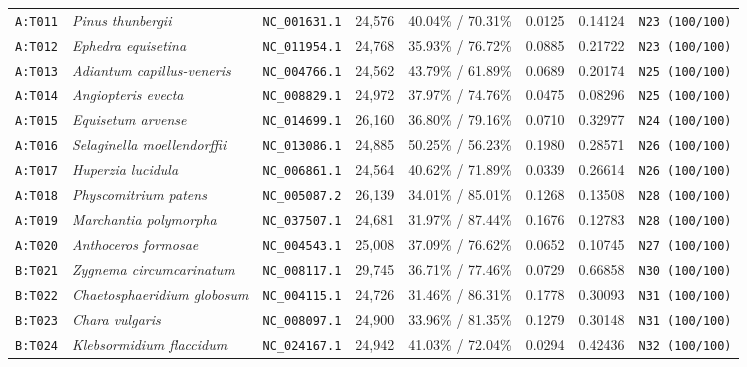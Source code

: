 \documentclass[10pt,letterpaper]{article}
\begin{document}
\begin{longtable}{llllllll}
\texttt{A:T011} & \textit{Pinus thunbergii} & \texttt{NC\_001631.1} & 24,576 & 40.04\% / 70.31\% & 0.0125 & 0.14124 & \texttt{N23 (100/100)} \\
\texttt{A:T012} & \textit{Ephedra equisetina} & \texttt{NC\_011954.1} & 24,768 & 35.93\% / 76.72\% & 0.0885 & 0.21722 & \texttt{N23 (100/100)} \\
\texttt{A:T013} & \textit{Adiantum capillus-veneris} & \texttt{NC\_004766.1} & 24,562 & 43.79\% / 61.89\% & 0.0689 & 0.20174 & \texttt{N25 (100/100)} \\
\texttt{A:T014} & \textit{Angiopteris evecta} & \texttt{NC\_008829.1} & 24,972 & 37.97\% / 74.76\% & 0.0475 & 0.08296 & \texttt{N25 (100/100)} \\
\texttt{A:T015} & \textit{Equisetum arvense} & \texttt{NC\_014699.1} & 26,160 & 36.80\% / 79.16\% & 0.0710 & 0.32977 & \texttt{N24 (100/100)} \\
\texttt{A:T016} & \textit{Selaginella moellendorffii} & \texttt{NC\_013086.1} & 24,885 & 50.25\% / 56.23\% & 0.1980 & 0.28571 & \texttt{N26 (100/100)} \\
\texttt{A:T017} & \textit{Huperzia lucidula} & \texttt{NC\_006861.1} & 24,564 & 40.62\% / 71.89\% & 0.0339 & 0.26614 & \texttt{N26 (100/100)} \\
\texttt{A:T018} & \textit{Physcomitrium patens} & \texttt{NC\_005087.2} & 26,139 & 34.01\% / 85.01\% & 0.1268 & 0.13508 & \texttt{N28 (100/100)} \\
\texttt{A:T019} & \textit{Marchantia polymorpha} & \texttt{NC\_037507.1} & 24,681 & 31.97\% / 87.44\% & 0.1676 & 0.12783 & \texttt{N28 (100/100)} \\
\texttt{A:T020} & \textit{Anthoceros formosae} & \texttt{NC\_004543.1} & 25,008 & 37.09\% / 76.62\% & 0.0652 & 0.10745 & \texttt{N27 (100/100)} \\
\texttt{B:T021} & \textit{Zygnema circumcarinatum} & \texttt{NC\_008117.1} & 29,745 & 36.71\% / 77.46\% & 0.0729 & 0.66858 & \texttt{N30 (100/100)} \\
\texttt{B:T022} & \textit{Chaetosphaeridium globosum} & \texttt{NC\_004115.1} & 24,726 & 31.46\% / 86.31\% & 0.1778 & 0.30093 & \texttt{N31 (100/100)} \\
\texttt{B:T023} & \textit{Chara vulgaris} & \texttt{NC\_008097.1} & 24,900 & 33.96\% / 81.35\% & 0.1279 & 0.30148 & \texttt{N31 (100/100)} \\
\texttt{B:T024} & \textit{Klebsormidium flaccidum} & \texttt{NC\_024167.1} & 24,942 & 41.03\% / 72.04\% & 0.0294 & 0.42436 & \texttt{N32 (100/100)} \\

\end{longtable}
\end{document}
